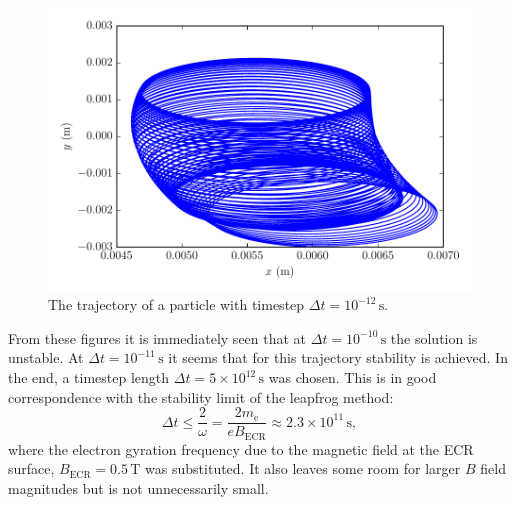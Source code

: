 \documentclass[12pt, a4paper]{article}
\begin{document}
\begin{figure}[t]
    \centering
    \includegraphics{output/particle_trajectory_12.pdf}
    \caption{The trajectory of a particle with timestep $\Delta t = 10^{-12}\,\si{\second}$.}
    \label{fig:particle12}
\end{figure}
From these figures it is immediately seen that at $\Delta t = 10^{-10}\,\si{\second}$ the solution is unstable. At $\Delta t = 10^{-11}\,\si{\second}$ it seems that for this trajectory stability is achieved. In the end, a timestep length $\Delta t = 5\times 10^{12}\,\si{\second}$ was chosen. This is in good correspondence with the stability limit of the leapfrog method:
\begin{equation}
    \Delta t \leq \frac{2}{\omega} = \frac{2 m_\text{e}}{eB_\text{ECR}} \approx 2.3\times 10^{11}\,\si{\second},
\end{equation}
where the electron gyration frequency due to the magnetic field at the ECR surface, $B_\text{ECR} = 0.5\,\si{\tesla}$ was substituted. It also leaves some room for larger $B$ field magnitudes but is not unnecessarily small.
\end{document}
